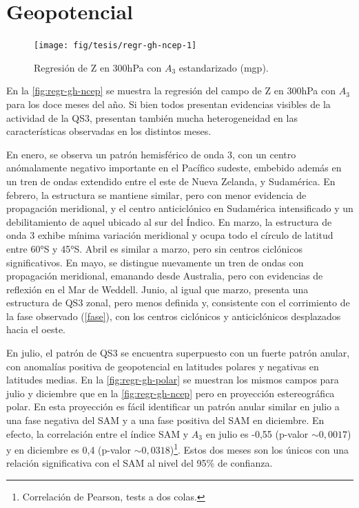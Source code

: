 \documentclass[spanish,a4paper,12pt,oneside]{book}
\let\rmarkdownfootnote\footnote%
\def\footnote{\protect\rmarkdownfootnote}
\begin{document}
\section*{Geopotencial}

\begin{landscape}\begin{figure}

{\centering \texttt{[image: fig/tesis/regr-gh-ncep-1]} 

}

\caption{Regresión de Z en 300hPa con $A_3$ estandarizado (mgp).}\label{fig:regr-gh-ncep}
\end{figure}
\end{landscape}

En la \autoref{fig:regr-gh-ncep} se muestra la regresión del campo de Z
en 300hPa con \(A_3\) para los doce meses del año. Si bien todos
presentan evidencias visibles de la actividad de la QS3, presentan
también mucha heterogeneidad en las características observadas en los
distintos meses.

En enero, se observa un patrón hemisférico de onda 3, con un centro
anómalamente negativo importante en el Pacífico sudeste, embebido además
en un tren de ondas extendido entre el este de Nueva Zelanda, y
Sudamérica. En febrero, la estructura se mantiene similar, pero con
menor evidencia de propagación meridional, y el centro anticiclónico en
Sudamérica intensificado y un debilitamiento de aquel ubicado al sur del
Índico. En marzo, la estructura de onda 3 exhibe mínima variación
meridional y ocupa todo el círculo de latitud entre 60°S y 45°S. Abril
es similar a marzo, pero sin centros ciclónicos significativos. En mayo,
se distingue nuevamente un tren de ondas con propagación meridional,
emanando desde Australia, pero con evidencias de reflexión en el Mar de
Weddell. Junio, al igual que marzo, presenta una estructura de QS3
zonal, pero menos definida y, consistente con el corrimiento de la fase
observado (\autoref{fase}), con los centros ciclónicos y anticiclónicos
desplazados hacia el oeste.

En julio, el patrón de QS3 se encuentra superpuesto con un fuerte patrón
anular, con anomalías positiva de geopotencial en latitudes polares y
negativas en latitudes medias. En la \autoref{fig:regr-gh-polar} se
muestran los mismos campos para julio y diciembre que en la
\autoref{fig:regr-gh-ncep} pero en proyección estereográfica polar. En
esta proyección es fácil identificar un patrón anular similar en julio a
una fase negativa del SAM y a una fase positiva del SAM en diciembre. En
efecto, la correlación entre el índice SAM y \(A_3\) en julio es -0,55
(p-valor \(\sim 0,0017\)) y en diciembre es 0,4 (p-valor
\(\sim 0,0318\))\footnote{Correlación de Pearson, tests a dos colas.}.
Estos dos meses son los únicos con una relación significativa con el SAM
al nivel del 95\% de confianza.
\end{document}
